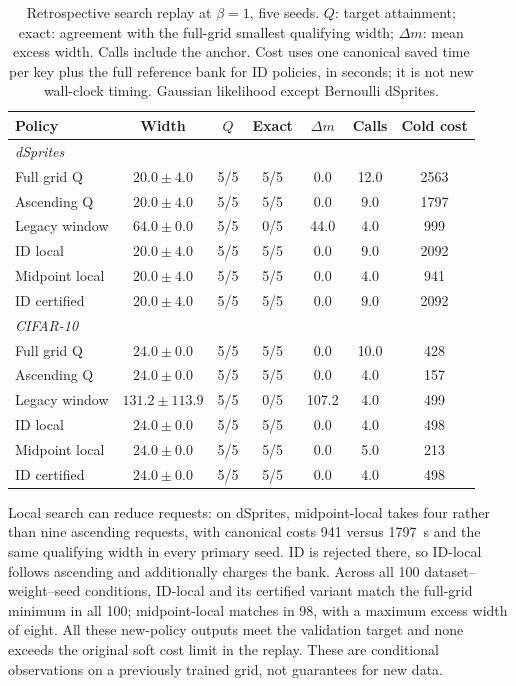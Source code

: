 \documentclass[make,article,submit,pdftex,moreauthors]{Definitions/mdpi}
\begin{document}
\begin{table}[H]
\caption{Retrospective search replay at $\beta=1$, five seeds. $Q$: target attainment; exact: agreement with the full-grid smallest qualifying width; $\Delta m$: mean excess width. Calls include the anchor. Cost uses one canonical saved time per key plus the full reference bank for ID policies, in seconds; it is not new wall-clock timing. Gaussian likelihood except Bernoulli dSprites.}\label{tab:replay2}
\small
\setlength{\tabcolsep}{3pt}
\begin{tabular*}{\textwidth}{@{\extracolsep{\fill}}lcccccc@{}}
\toprule
Policy & Width & $Q$ & Exact & $\Delta m$ & Calls & Cold cost \\
\midrule
\multicolumn{7}{l}{\emph{dSprites}} \\
Full grid Q & $20.0 \pm 4.0$ & 5/5 & 5/5 & 0.0 & 12.0 & 2563 \\
Ascending Q & $20.0 \pm 4.0$ & 5/5 & 5/5 & 0.0 & 9.0 & 1797 \\
Legacy window & $64.0 \pm 0.0$ & 5/5 & 0/5 & 44.0 & 4.0 & 999 \\
ID local & $20.0 \pm 4.0$ & 5/5 & 5/5 & 0.0 & 9.0 & 2092 \\
Midpoint local & $20.0 \pm 4.0$ & 5/5 & 5/5 & 0.0 & 4.0 & 941 \\
ID certified & $20.0 \pm 4.0$ & 5/5 & 5/5 & 0.0 & 9.0 & 2092 \\
\midrule
\multicolumn{7}{l}{\emph{CIFAR-10}} \\
Full grid Q & $24.0 \pm 0.0$ & 5/5 & 5/5 & 0.0 & 10.0 & 428 \\
Ascending Q & $24.0 \pm 0.0$ & 5/5 & 5/5 & 0.0 & 4.0 & 157 \\
Legacy window & $131.2 \pm 113.9$ & 5/5 & 0/5 & 107.2 & 4.0 & 499 \\
ID local & $24.0 \pm 0.0$ & 5/5 & 5/5 & 0.0 & 4.0 & 498 \\
Midpoint local & $24.0 \pm 0.0$ & 5/5 & 5/5 & 0.0 & 5.0 & 213 \\
ID certified & $24.0 \pm 0.0$ & 5/5 & 5/5 & 0.0 & 4.0 & 498 \\
\bottomrule\end{tabular*}
\end{table}


Local search can reduce requests: on dSprites, midpoint-local takes
four rather than nine ascending requests, with canonical costs 941
versus 1797~s and the same qualifying width in every primary seed.
ID is rejected there, so ID-local follows ascending and additionally
charges the bank. Across all 100 dataset--weight--seed conditions,
ID-local and its certified variant match the full-grid minimum in all
100; midpoint-local matches in 98, with a maximum excess width of eight.
All these new-policy outputs meet the validation target and none exceeds
the original soft cost limit in the replay. These are conditional
observations on a previously trained grid, not guarantees for new data.
\end{document}
